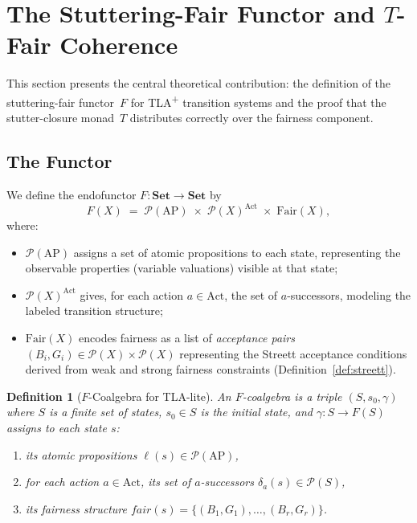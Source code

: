 \documentclass[11pt]{article}
\newtheorem{definition}[theorem]{Definition}
\newcommand{\Set}{\mathbf{Set}}
\newcommand{\Pow}{\mathcal{P}}
\newcommand{\Fair}{\ensuremath{\mathrm{Fair}}}
\newcommand{\Act}{\ensuremath{\mathrm{Act}}}
\newcommand{\AP}{\ensuremath{\mathrm{AP}}}
\newcommand{\TFair}{$T$-Fair}
\newcommand{\TLAplus}{TLA\textsuperscript{+}}
\begin{document}
\section{The Stuttering-Fair Functor and \TFair{} Coherence}
\label{sec:functor}

This section presents the central theoretical contribution: the definition
of the stuttering-fair functor~$F$ for \TLAplus{} transition systems and
the proof that the stutter-closure monad~$T$ distributes correctly over
the fairness component.

\subsection{The Functor}

We define the endofunctor $F : \Set \to \Set$ by
\begin{equation}\label{eq:functor}
  F(X) \;=\; \Pow(\AP) \;\times\; \Pow(X)^{\Act} \;\times\; \Fair(X),
\end{equation}
where:
\begin{itemize}[nosep]
\item $\Pow(\AP)$ assigns a set of atomic propositions to each state,
  representing the observable properties (variable valuations) visible
  at that state;
\item $\Pow(X)^{\Act}$ gives, for each action $a \in \Act$, the set of
  $a$-successors, modeling the labeled transition structure;
\item $\Fair(X)$ encodes fairness as a list of \emph{acceptance pairs}
  $(B_i, G_i) \in \Pow(X) \times \Pow(X)$ representing the Streett
  acceptance conditions derived from weak and strong fairness
  constraints (Definition~\ref{def:streett}).
\end{itemize}

\begin{definition}[$F$-Coalgebra for TLA-lite]
\label{def:fcoalg}
An \emph{$F$-coalgebra} is a triple $(S, s_0, \gamma)$ where $S$ is a
finite set of states, $s_0 \in S$ is the initial state, and
$\gamma : S \to F(S)$ assigns to each state $s$:
\begin{enumerate}[nosep]
\item its atomic propositions $\ell(s) \in \Pow(\AP)$,
\item for each action $a \in \Act$, its set of $a$-successors
  $\delta_a(s) \in \Pow(S)$,
\item its fairness structure
  $\mathit{fair}(s) = \{(B_1, G_1), \ldots, (B_r, G_r)\}$.
\end{enumerate}
\end{definition}
\end{document}
